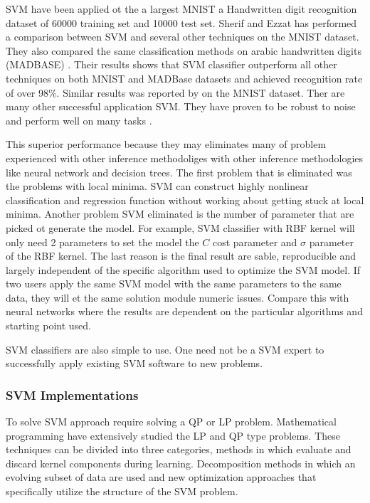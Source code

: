 
SVM have been applied ot the a largest MNIST a Handwritten digit recognition dataset of 60000 training set and 10000 test set\cite{IjdarSherifPaper}. Sherif and Ezzat has performed a comparison between SVM and several other techniques on the MNIST dataset. They also compared the same classification methods on arabic handwritten digits (MADBASE) \cite{ADBase9,IjdarSherifPaper}. Their results shows that SVM classifier outperform all other techniques on both MNIST and MADBase datasets and achieved recognition rate of over 98\%. Similar results was reported by \cite{empiricalcomp11,SVMInvariantComDecoste02} on the MNIST dataset. Ther are many other successful application SVM. They have proven to be robust to noise and perform well on many tasks \cite{empiricalcomp11,Scholkopf97comparingsupport}. 


This superior performance because they may eliminates many of problem experienced with other inference methodoliges with other inference methodologies like neural network and decision trees. The first problem that is eliminated was the problems with local minima. SVM can construct highly nonlinear classification and regression function without working about getting stuck at local minima. Another problem SVM eliminated is the number of parameter that are picked ot generate the model. For example, SVM classifier with RBF  kernel will only need 2 parameters to set the model the $C$ cost parameter and $\sigma$ parameter of the RBF kernel. The last reason is the final result are sable, reproducible and largely independent of the specific algorithm used to  optimize the SVM model. If two users apply the same SVM model with the same parameters to the same data, they will et the same solution module numeric issues. Compare this with neural networks where the results are dependent on the particular algorithms and starting point used. 

SVM classifiers are also simple to use. One need not be a SVM expert to successfully apply existing SVM software to new problems. 



\subsubsection {SVM Implementations}
To solve SVM approach require solving a QP or LP problem.  Mathematical programming have extensively studied the LP and QP type problems. These techniques can be divided into three categories, methods in which evaluate and discard kernel components during learning. Decomposition methods in which an evolving subset of data are used and new optimization approaches that specifically utilize the structure of the SVM problem. 

